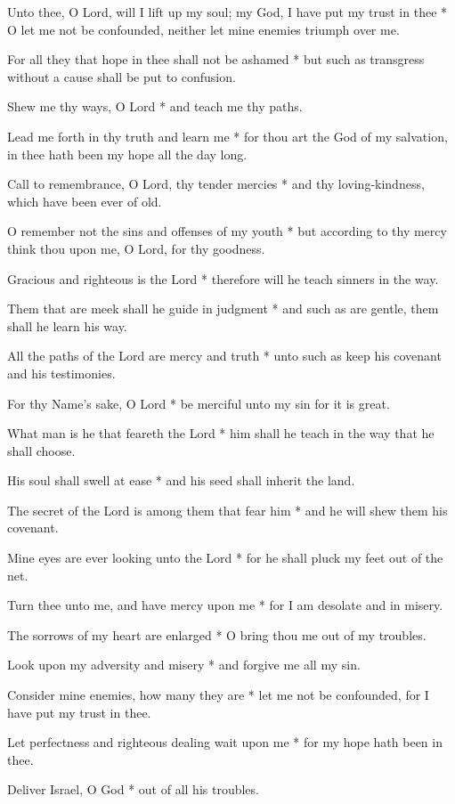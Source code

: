 Unto thee, O Lord, will I lift up my soul; my God, I have put my trust in thee * O let me not be confounded, neither let mine enemies triumph over me.

For all they that hope in thee shall not be ashamed * but such as transgress without a cause shall be put to confusion.

Shew me thy ways, O Lord * and teach me thy paths.

Lead me forth in thy truth and learn me * for thou art the God of my salvation, in thee hath been my hope all the day long.

Call to remembrance, O Lord, thy tender mercies * and thy loving-kindness, which have been ever of old.

O remember not the sins and offenses of my youth * but according to thy mercy think thou upon me, O Lord, for thy goodness.

Gracious and righteous is the Lord * therefore will he teach sinners in the way.

Them that are meek shall he guide in judgment * and such as are gentle, them shall he learn his way.

All the paths of the Lord are mercy and truth * unto such as keep his covenant and his testimonies.

For thy Name's sake, O Lord * be merciful unto my sin for it is great.

What man is he that feareth the Lord * him shall he teach in the way that he shall choose.

His soul shall swell at ease * and his seed shall inherit the land.

The secret of the Lord is among them that fear him * and he will shew them his covenant.

Mine eyes are ever looking unto the Lord * for he shall pluck my feet out of the net.

Turn thee unto me, and have mercy upon me * for I am desolate and in misery.

The sorrows of my heart are enlarged * O bring thou me out of my troubles.

Look upon my adversity and misery * and forgive me all my sin.

Consider mine enemies, how many they are * let me not be confounded, for I have put my trust in thee.

Let perfectness and righteous dealing wait upon me * for my hope hath been in thee.

Deliver Israel, O God * out of all his troubles.